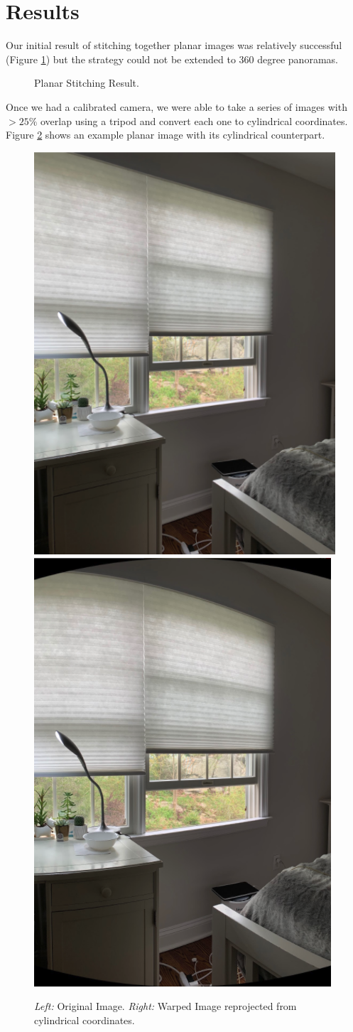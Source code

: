 \documentclass[10pt,twocolumn,letterpaper]{article}
\begin{document}
\section{Results}

Our initial result of stitching together planar images was relatively successful (Figure \ref{fig:result1}) but the strategy could not be extended to 360 degree panoramas.

\begin{figure}[h]
    \centering
    \caption{Planar Stitching Result.}
    \label{fig:result1}
\end{figure}

Once we had a calibrated camera, we were able to take a series of images with $>25\%$ overlap using a tripod and convert each one to cylindrical coordinates. Figure \ref{fig:result2} shows an example planar image with its cylindrical counterpart.\\

\pagebreak

\begin{figure}[h]
    \centering
    \includegraphics[width=0.5\linewidth]{noncylindrical.png}
    \includegraphics[width=0.465\linewidth]{cylindrical.png}
    \caption{\emph{Left:} Original Image. \emph{Right:} Warped Image reprojected from cylindrical coordinates.}
    \label{fig:result2}
\end{figure}
\end{document}

